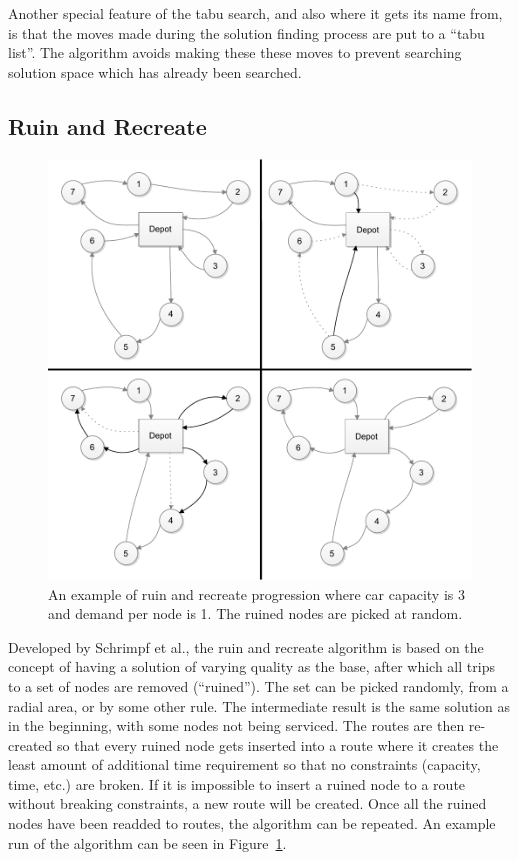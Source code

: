 Another special feature of the tabu search, and also where it gets its name from, is that the moves made during the solution finding process are put to a ``tabu list''. The algorithm avoids making these these moves to prevent searching solution space which has already been searched. \cite{gendreau1994tabu}
 

\subsection {Ruin and Recreate}
\label{subsection:ruinandrecreate} 

\begin{figure}[h]
  \begin{center}
    \includegraphics[width=\textwidth]{images/ruinrecreate.pdf}
    \caption{An example of ruin and recreate progression where car capacity is 3 and demand per node is 1. The ruined nodes are picked at random.}
    \label{fig:ruinrecreate}
  \end{center}
\end{figure}

Developed by Schrimpf et al., the ruin and recreate algorithm is based on the concept of having a solution of varying quality as the base, after which all trips to a set of nodes are removed (``ruined''). The set can be picked randomly, from a radial area, or by some other rule. The intermediate result is the same solution as in the beginning, with some nodes not being serviced. The routes are then re-created so that every ruined node gets inserted into a route where it creates the least amount of additional time requirement so that no constraints (capacity, time, etc.) are broken. If it is impossible to insert a ruined node to a route without breaking constraints, a new route will be created. Once all the ruined nodes have been readded to routes, the algorithm can be repeated. An example run of the algorithm can be seen in Figure~\ref{fig:ruinrecreate}. \cite{schrimpf2000record} 


